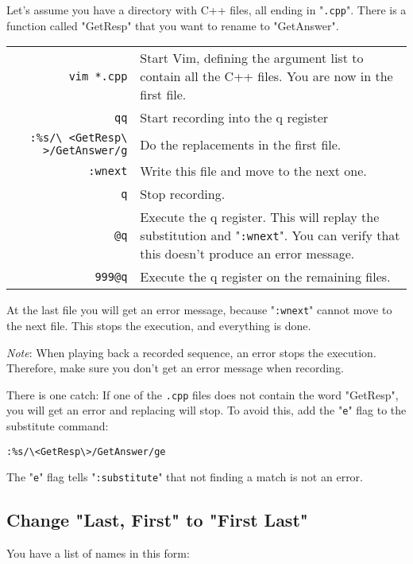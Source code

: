 Let's assume you have a directory with C++ files, all ending in "\texttt{.cpp}".
There is a function called "GetResp" that you want to rename to "GetAnswer".

\begin{center} \begin{tabularx}{\textwidth}{r p{11cm}} %
				\texttt{vim *.cpp} & Start Vim, defining the argument list to contain all the C++ files.
				You are now in the first file. \\
				\texttt{qq} & Start recording into the q register \\
				\texttt{:\%s/\textbackslash{} <GetResp\textbackslash{} >/GetAnswer/g} & Do the replacements in the first file. \\
				\texttt{:wnext} & Write this file and move to the next one. \\
				\texttt{q} & Stop recording. \\
				\texttt{@q} & Execute the q register.
				This will replay the substitution and "\texttt{:wnext}".
				You can verify that this doesn't produce an error message. \\
				\texttt{999@q} & Execute the q register on the remaining files.  \\
\end{tabularx} \end{center}

At the last file you will get an error message, because "\texttt{:wnext}" cannot move to the next file.
This stops the execution, and everything is done.

\emph{Note}: When playing back a recorded sequence, an error stops the execution.
Therefore, make sure you don't get an error message when recording.

There is one catch: If one of the \texttt{.cpp} files does not contain the word "GetResp", you will get an error and replacing will stop.
To avoid this, add the "\texttt{e}" flag to the substitute command:

\begin{Verbatim}[samepage=true]
 :%s/\<GetResp\>/GetAnswer/ge
\end{Verbatim}

The "\texttt{e}" flag tells "\texttt{:substitute}" that not finding a match is not an error.
\subsection{Change "Last, First" to "First Last"}
You have a list of names in this form:

